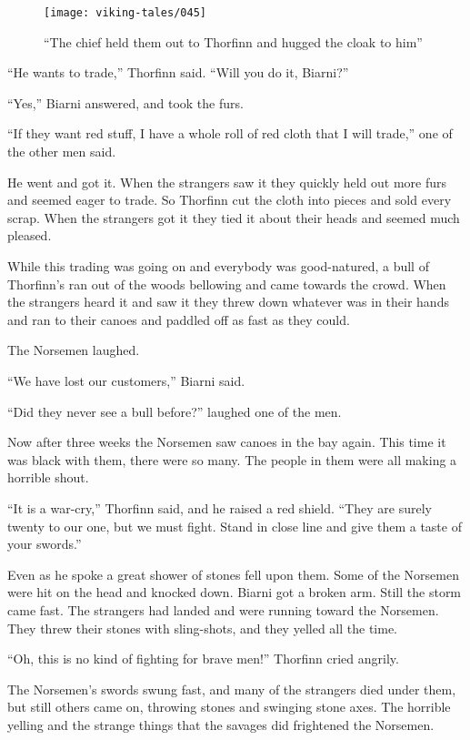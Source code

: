\begin{figure}
    \centering
    \texttt{[image: viking-tales/045]}
    \caption{``The chief held them out to Thorfinn and hugged the cloak
        to him''}
\end{figure}

``He wants to trade,'' Thorfinn said. ``Will you do it, Biarni?''

``Yes,'' Biarni answered, and took the furs.

``If they want red stuff, I have a whole roll of red cloth that I will
trade,'' one of the other men said.

He went and got it. When the strangers saw it they quickly held out more
furs and seemed eager to trade. So Thorfinn cut the cloth into pieces
and sold every scrap. When the strangers got it they tied it about their
heads and seemed much pleased.

While this trading was going on and everybody was good-natured, a bull
of Thorfinn's ran out of the woods bellowing and came towards the crowd.
When the strangers heard it and saw it they threw down whatever was in
their hands and ran to their canoes and paddled off as fast as they
could.

The Norsemen laughed.

``We have lost our customers,'' Biarni said.

``Did they never see a bull before?'' laughed one of the men.

Now after three weeks the Norsemen saw canoes in the bay again. This
time it was black with them, there were so many. The people in them were
all making a horrible shout.

``It is a war-cry,'' Thorfinn said, and he raised a red shield. ``They
are surely twenty to our one, but we must fight. Stand in close line and
give them a taste of your swords.''

Even as he spoke a great shower of stones fell upon them. Some of the
Norsemen were hit on the head and knocked down. Biarni got a broken arm.
Still the storm came fast. The strangers had landed and were running
toward the Norsemen. They threw their stones with sling-shots, and they
yelled all the time.

``Oh, this is no kind of fighting for brave men!'' Thorfinn cried
angrily.

The Norsemen's swords swung fast, and many of the strangers died under
them, but still others came on, throwing stones and swinging stone axes.
The horrible yelling and the strange things that the savages did
frightened the Norsemen.

